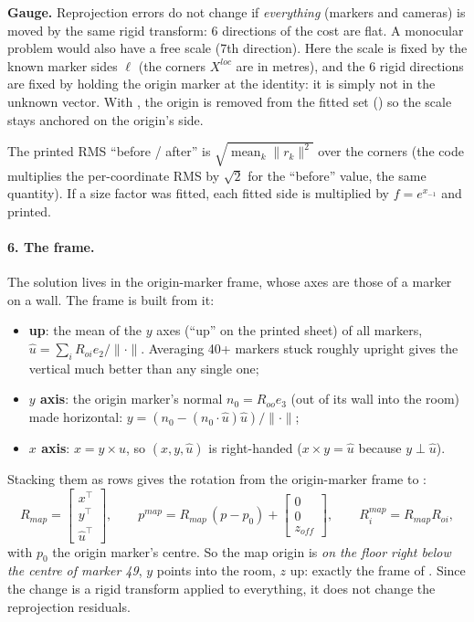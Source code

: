 \begin{keypoint}
\textbf{Gauge.} Reprojection errors do not change if \emph{everything} (markers and cameras) is moved by the same
rigid transform: 6 directions of the cost are flat. A monocular problem would also have a free scale (7th
direction). Here the scale is fixed by the known marker sides $\ell$ (the corners $X^{loc}$ are in metres), and
the 6 rigid directions are fixed by holding the origin marker at the identity: it is simply not in the unknown
vector. With , the origin is removed from the fitted set ()
so the scale stays anchored on the origin's side.
\end{keypoint}

The printed RMS ``before / after'' is $\sqrt{\operatorname{mean}_k \lVert r_k\rVert^2}$ over the corners (the
code multiplies the per-coordinate RMS by $\sqrt2$ for the ``before'' value, the same quantity). If a size factor
was fitted, each fitted side is multiplied by $f = e^{x_{-1}}$ and printed.

\paragraph{6. The  frame.} The solution lives in the origin-marker frame, whose axes are those of a
marker on a wall. The  frame is built from it:
\begin{itemize}[nosep]
\item \textbf{up}: the mean of the $y$ axes (``up'' on the printed sheet) of all markers,
  $\hat u = \sum_i R_{oi} e_2 / \lVert\cdot\rVert$. Averaging 40+ markers stuck roughly upright gives the
  vertical much better than any single one;
\item \textbf{$y$ axis}: the origin marker's normal $n_0 = R_{oo} e_3$ (out of its wall into the room) made
  horizontal: $y = (n_0 - (n_0 \cdot \hat u)\hat u)/\lVert\cdot\rVert$;
\item \textbf{$x$ axis}: $x = y \times \hat u$, so $(x, y, \hat u)$ is right-handed
  ($x \times y = \hat u$ because $y \perp \hat u$).
\end{itemize}
Stacking them as rows gives the rotation from the origin-marker frame to :
\[
R_{map} = \begin{bmatrix} x^\top \\ y^\top \\ \hat u^\top \end{bmatrix},
\qquad
p^{map} = R_{map}\,(p - p_0) + \begin{bmatrix} 0 \\ 0 \\ z_{off} \end{bmatrix},
\qquad R^{map}_i = R_{map} R_{oi},
\]
with $p_0$ the origin marker's centre. So the map origin is \emph{on the floor right below the centre of
marker 49}, $y$ points into the room, $z$ up: exactly the  frame of
. Since the change is a rigid transform applied to everything, it does not change
the reprojection residuals.

